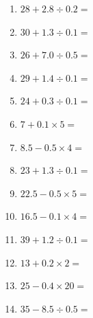 \documentclass[12pt]{article}
\begin{document}
\begin{enumerate}
\item \large $ 28 + 2.8 \div 0.2 = $ \vspace{1.6cm}
\item \large $ 30 + 1.3 \div 0.1 = $ \vspace{1.6cm}
\item \large $ 26 + 7.0 \div 0.5 = $ \vspace{1.6cm}
\item \large $ 29 + 1.4 \div 0.1 = $ \vspace{1.6cm}
\newpage
\item \large $ 24 + 0.3 \div 0.1 = $ \vspace{1.6cm}
\item \large $ 7 + 0.1 \times 5 = $ \vspace{1.6cm}
\item \large $ 8.5 - 0.5 \times 4 = $ \vspace{1.6cm}
\item \large $ 23 + 1.3 \div 0.1 = $ \vspace{1.6cm}
\item \large $ 22.5 - 0.5 \times 5 = $ \vspace{1.6cm}
\item \large $ 16.5 - 0.1 \times 4 = $ \vspace{1.6cm}
\item \large $ 39 + 1.2 \div 0.1 = $ \vspace{1.6cm}
\item \large $ 13 + 0.2 \times 2 = $ \vspace{1.6cm}
\item \large $ 25 - 0.4 \times 20 = $ \vspace{1.6cm}
\item \large $ 35 - 8.5 \div 0.5 = $ \vspace{1.6cm}
\end{enumerate}
\newpage
\end{document}

